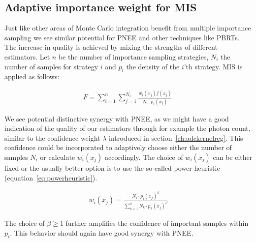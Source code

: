\subsection{Adaptive importance weight for MIS}

Just like other areas of Monte Carlo integration benefit from multiple importance sampling we see similar potential for PNEE and other techniques like PBRTs. The increase in quality is achieved by mixing the strengths of different estimators. Let $n$ be the number of importance sampling strategies, $N_i$ the number of samples for strategy $i$ and $p_i$ the density of the $i$'th strategy. MIS is applied as follows:

\begin{align}
F = \sum_{i=1}^{n}\sum_{j=1}^{N_i}\frac{w_i(x_j)f(x_j)}{N_i \cdot p_i(x_j)}.
\label{eq:mis}
\end{align}

We see potential distinctive synergy with PNEE, as we might have a good indication of the quality of our estimators through for example the photon count, similar to the confidence weight $\lambda$ introduced in section~\ref{ch:adckernelreg}. This confidence could be incorporated to adaptively choose either the number of samples $N_i$ or calculate $w_i(x_j)$ accordingly. The choice of $w_i(x_j)$ can be either fixed or the usually better option is to use the so-called power heuristic (equation~\ref{eq:powerheuristic})\parencite{veach1997robust}. 

\begin{align}
w_i(x_j) = \frac{N_i \cdot p_i(x_j)^\beta}{\sum_{k=1}^{n} N_k \cdot p_k(x_j)^\beta}
\label{eq:powerheuristic}
\end{align}

The choice of $\beta \geq 1$ further amplifies the confidence of important samples within $p_i$. This behavior should again have good synergy with PNEE.